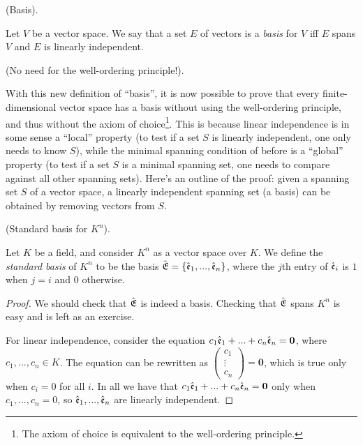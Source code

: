 \begin{defn}
    (Basis).
    
    Let $V$ be a vector space. We say that a set $E$ of vectors is a \textit{basis} for $V$ iff $E$ spans $V$ and $E$ is linearly independent.
\end{defn}

\begin{remark}
    (No need for the well-ordering principle!).

    With this new definition of ``basis'', it is now possible to prove that every finite-dimensional vector space has a basis without using the well-ordering principle, and thus without the axiom of choice\footnote{The axiom of choice is equivalent to the well-ordering principle.}. This is because linear independence is in some sense a ``local'' property (to test if a set $S$ is linearly independent, one only needs to know $S$), while the minimal spanning condition of before is a ``global'' property (to test if a set $S$ is a minimal spanning set, one needs to compare against all other spanning sets). Here's an outline of the proof: given a spanning set $S$ of a vector space, a linearly independent spanning set (a basis) can be obtained by removing vectors from $S$.
\end{remark}

\begin{defn}
    (Standard basis for $K^n$).
    
    Let $K$ be a field, and consider $K^n$ as a vector space over $K$. We define the \textit{standard basis} of $K^n$ to be the basis ${\hat{\mathfrak{E}}} = \{\hat{\mathfrak{e}}_1, ..., \hat{\mathfrak{e}}_n\}$, where the $j$th entry of $\hat{\mathfrak{e}}_i$ is $1$ when $j = i$ and $0$ otherwise.
\end{defn}

\begin{proof}
   We should check that ${\hat{\mathfrak{E}}}$ is indeed a basis. Checking that ${\hat{\mathfrak{E}}}$ spans $K^n$ is easy and is left as an exercise.
   
   For linear independence, consider the equation $c_1 \hat{\mathfrak{e}}_1 + ... + c_n \hat{\mathfrak{e}}_n = \mathbf{0}$, where $c_1, ..., c_n \in K$. The equation can be rewritten as $\begin{pmatrix} c_1 \\ \vdots \\ c_n \end{pmatrix} = \mathbf{0}$, which is true only when $c_i = 0$ for all $i$. In all we have that $c_1 \hat{\mathfrak{e}}_1 + ... + c_n \hat{\mathfrak{e}}_n = \mathbf{0}$ only when $c_1, ..., c_n = 0$, so $\hat{\mathfrak{e}}_1, ..., \hat{\mathfrak{e}}_n$ are linearly independent.
\end{proof}

